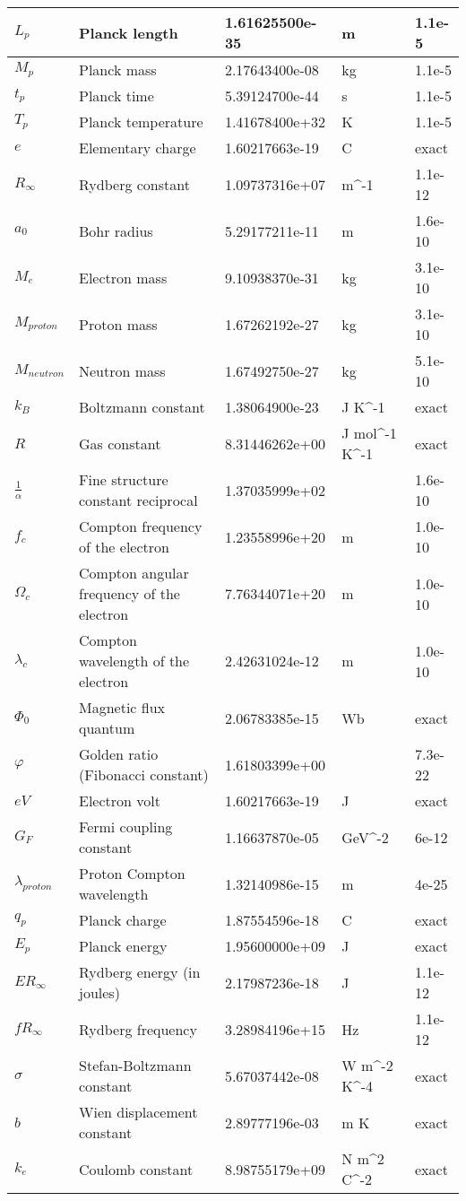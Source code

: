 \documentclass{article}%
\begin{document}
\begin{table}[H]
\begin{tabular}{|p{1.5cm}|p{6cm}|p{2.5cm}|p{2cm}|p{2cm}|}
$L_p$ & Planck length & 1.61625500e-35 & m & 1.1e-5 \\ \hline%
$M_p$ & Planck mass & 2.17643400e-08 & kg & 1.1e-5 \\ \hline%
$t_p$ & Planck time & 5.39124700e-44 & s & 1.1e-5 \\ \hline%
$T_p$ & Planck temperature & 1.41678400e+32 & K & 1.1e-5 \\ \hline%
$e$ & Elementary charge & 1.60217663e-19 & C & exact \\ \hline%
$R_\infty$ & Rydberg constant & 1.09737316e+07 & m^-1 & 1.1e-12 \\ \hline%
$a_0$ & Bohr radius & 5.29177211e-11 & m & 1.6e-10 \\ \hline%
$M_e$ & Electron mass & 9.10938370e-31 & kg & 3.1e-10 \\ \hline%
$M_{proton}$ & Proton mass & 1.67262192e-27 & kg & 3.1e-10 \\ \hline%
$M_{neutron}$ & Neutron mass & 1.67492750e-27 & kg & 5.1e-10 \\ \hline%
$k_B$ & Boltzmann constant & 1.38064900e-23 & J K^-1 & exact \\ \hline%
$R$ & Gas constant & 8.31446262e+00 & J mol^-1 K^-1 & exact \\ \hline%
$\frac{1}{\alpha}$ & Fine structure constant reciprocal & 1.37035999e+02 &  & 1.6e-10 \\ \hline%
$f_c$ & Compton frequency of the electron & 1.23558996e+20 & m & 1.0e-10 \\ \hline%
$\Omega_c$ & Compton angular frequency of the electron & 7.76344071e+20 & m & 1.0e-10 \\ \hline%
$\lambda_c$ & Compton wavelength of the electron & 2.42631024e-12 & m & 1.0e-10 \\ \hline%
$\Phi_0$ & Magnetic flux quantum & 2.06783385e-15 & Wb & exact \\ \hline%
$\varphi$ & Golden ratio (Fibonacci constant) & 1.61803399e+00 &  & 7.3e-22 \\ \hline%
$eV$ & Electron volt & 1.60217663e-19 & J & exact \\ \hline%
$G_F$ & Fermi coupling constant & 1.16637870e-05 & GeV^-2 & 6e-12 \\ \hline%
$\lambda_{proton}$ & Proton Compton wavelength & 1.32140986e-15 & m & 4e-25 \\ \hline%
$q_p$ & Planck charge & 1.87554596e-18 & C & exact \\ \hline%
$E_p$ & Planck energy & 1.95600000e+09 & J & exact \\ \hline%
$ER_\infty$ & Rydberg energy (in joules) & 2.17987236e-18 & J & 1.1e-12 \\ \hline%
$fR_\infty$ & Rydberg frequency & 3.28984196e+15 & Hz & 1.1e-12 \\ \hline%
$\sigma$ & Stefan-Boltzmann constant & 5.67037442e-08 & W m^-2 K^-4 & exact \\ \hline%
$b$ & Wien displacement constant & 2.89777196e-03 & m K & exact \\ \hline%
$k_e$ & Coulomb constant & 8.98755179e+09 & N m^2 C^-2 & exact \\ \hline%


\end{tabular}
\end{table}
\end{document}
